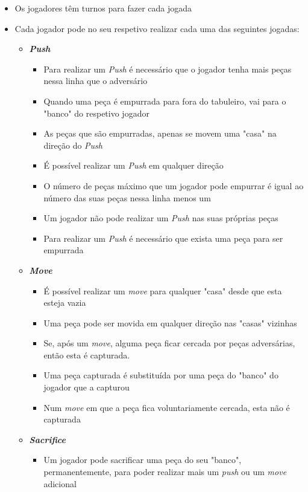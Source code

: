 \documentclass[a4paper]{article}
\begin{document}
\newpage

\begin{itemize}
	\item Os jogadores têm turnos para fazer cada jogada
	\item Cada jogador pode no seu respetivo realizar cada uma das seguintes jogadas:
			\begin{itemize}
				\item[] \textbf{\textit{Push}}
				\begin{itemize}
					\item Para realizar um \textit{Push} é necessário que o jogador tenha mais peças nessa linha que o adversário
					\item Quando uma peça é empurrada para fora do tabuleiro, vai para o "banco" do respetivo jogador
					\item As peças que são empurradas, apenas se movem uma "casa" na direção do \textit{Push}
					\item É possível realizar um \textit{Push} em qualquer direção
					\item O número de peças máximo que um jogador pode empurrar é igual ao número das suas peças nessa linha menos um
					\item Um jogador não pode realizar um \textit{Push} nas suas próprias peças
					\item Para realizar um \textit{Push} é necessário que exista uma peça para ser empurrada
				\end{itemize}
				\item[] \textbf{\textit{Move}}
				\begin{itemize}
					\item É possível realizar um \textit{move} para qualquer "casa" desde que esta esteja vazia
					\item Uma peça pode ser movida em qualquer direção nas "casas" vizinhas
					\item Se, após um \textit{move}, alguma peça ficar cercada por peças adversárias, então esta é capturada.
					\item Uma peça capturada é substituída por uma peça do "banco" do jogador que a capturou
					\item Num \textit{move} em que a peça fica voluntariamente cercada, esta não é capturada
				\end{itemize}
				\item[] \textbf{\textit{Sacrifice}}
				\begin{itemize}
					\item Um jogador pode sacrificar uma peça do seu "banco", permanentemente, para poder realizar mais um \textit{push} ou um \textit{move} adicional

\end{itemize}
\end{itemize}
\end{itemize}
\end{document}
